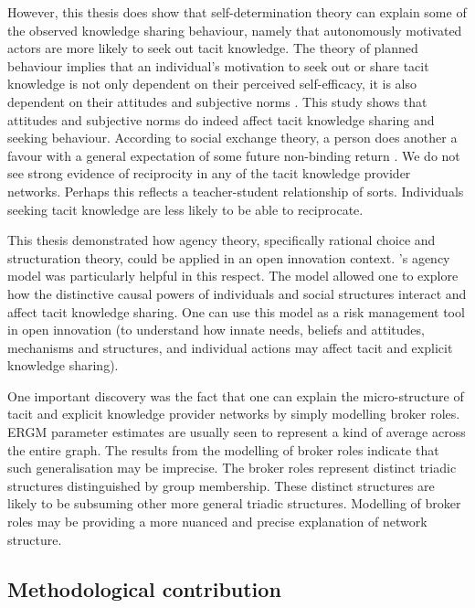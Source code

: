 However, this thesis does show that self-determination theory can explain some of the observed knowledge sharing behaviour, namely that autonomously motivated actors are more likely to seek out tacit knowledge. The theory of planned behaviour implies that an individual's motivation to seek out or share tacit knowledge is not only dependent on their perceived self-efficacy, it is also dependent on their attitudes and subjective norms \citep{gagne2009model}. This study shows that attitudes and subjective norms do indeed affect tacit knowledge sharing and seeking behaviour. According to social exchange theory, a person does another a favour with a general expectation of some future non-binding return \citep{homans1961social}. We do not see strong evidence of reciprocity in any of the tacit knowledge provider networks. Perhaps this reflects a teacher-student relationship of sorts. Individuals seeking tacit knowledge are less likely to be able to reciprocate. \medskip

This thesis demonstrated how agency theory, specifically rational choice and structuration theory, could be applied in an open innovation context. \citeauthor{loyal2001agency}'s \citeyearpar{loyal2001agency} agency model was particularly helpful in this respect. The model allowed one to explore how the distinctive causal powers of individuals and social structures interact and affect tacit knowledge sharing. One can use this model as a risk management tool in open innovation (to understand how innate needs, beliefs and attitudes, mechanisms and structures, and individual actions may affect tacit and explicit knowledge sharing). 

One important discovery was the fact that one can explain the micro-structure of tacit and explicit knowledge provider networks by simply modelling broker roles. ERGM parameter estimates are usually seen to represent a kind of average across the entire graph. The results from the modelling of broker roles indicate that such generalisation may be imprecise. The broker roles represent distinct triadic structures distinguished by group membership. These distinct structures are likely to be subsuming other more general triadic structures. Modelling of broker roles may be providing a more nuanced and precise explanation of network structure. 

\subsection{Methodological contribution}


